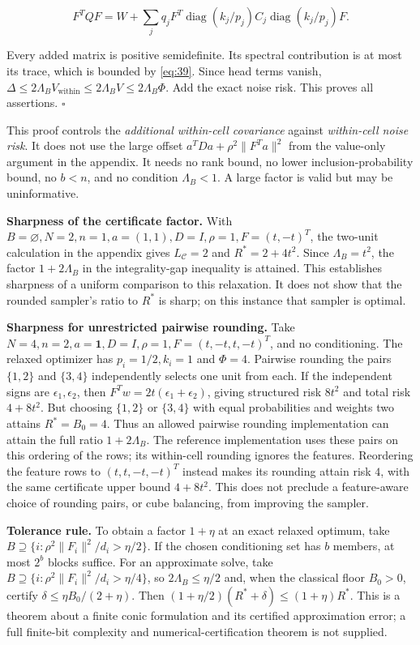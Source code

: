 \documentclass[11pt]{article}
\begin{document}
\[
F^TQF=W+\sum_jq_jF^T\operatorname{diag}(k_j/p_j)C_j\operatorname{diag}(k_j/p_j)F.
\]

Every added matrix is positive semidefinite. Its spectral contribution
is at most its trace, which is bounded by \eqref{eq:39}. Since head
terms vanish,
\(\Delta\le2\Lambda_B V_{\mathrm{within}}\le2\Lambda_B V\le2\Lambda_B\Phi\).
Add the exact noise risk. This proves all assertions. \(\square\)

This proof controls the \emph{additional within-cell covariance} against
\emph{within-cell noise risk}. It does not use the large offset
\(a^TDa+\rho^2\|F^Ta\|^2\) from the value-only argument in the appendix.
It needs no rank bound, no lower inclusion-probability bound, no
\(b<n\), and no condition \(\Lambda_B<1\). A large factor is valid but
may be uninformative.

\textbf{Sharpness of the certificate factor.} With
\(B=\varnothing,N=2,n=1,a=(1,1),D=I,\rho=1,F=(t,-t)^T\), the two-unit
calculation in the appendix gives \(L_{\mathcal C}=2\) and
\(R^*=2+4t^2\). Since \(\Lambda_B=t^2\), the factor \(1+2\Lambda_B\) in
the integrality-gap inequality is attained. This establishes sharpness
of a uniform comparison to this relaxation. It does not show that the
rounded sampler's ratio to \(R^*\) is sharp; on this instance that
sampler is optimal.

\textbf{Sharpness for unrestricted pairwise rounding.} Take
\(N=4,n=2,a=\mathbf1,D=I,\rho=1,F=(t,-t,t,-t)^T\), and no conditioning.
The relaxed optimizer has \(p_i=1/2,k_i=1\) and \(\Phi=4\). Pairwise
rounding the pairs \(\{1,2\}\) and \(\{3,4\}\) independently selects one
unit from each. If the independent signs are \(\epsilon_1,\epsilon_2\),
then \(F^Tw=2t(\epsilon_1+\epsilon_2)\), giving structured risk \(8t^2\)
and total risk \(4+8t^2\). But choosing \(\{1,2\}\) or \(\{3,4\}\) with
equal probabilities and weights two attains \(R^*=B_0=4\). Thus an
allowed pairwise rounding implementation can attain the full ratio
\(1+2\Lambda_B\). The reference implementation uses these pairs on this
ordering of the rows; its within-cell rounding ignores the features.
Reordering the feature rows to \((t,t,-t,-t)^T\) instead makes its
rounding attain risk \(4\), with the same certificate upper bound
\(4+8t^2\). This does not preclude a feature-aware choice of
rounding pairs, or cube balancing, from improving the sampler.

\textbf{Tolerance rule.} To obtain a factor \(1+\eta\) at an exact
relaxed optimum, take \(B\supseteq\{i:\rho^2\|F_i\|^2/d_i>\eta/2\}\). If
the chosen conditioning set has \(b\) members, at most \(2^b\) blocks
suffice. For an approximate solve, take
\(B\supseteq\{i:\rho^2\|F_i\|^2/d_i>\eta/4\}\), so
\(2\Lambda_B\le\eta/2\) and, when the classical floor \(B_0>0\), certify
\(\delta\le\eta B_0/(2+\eta)\). Then
\((1+\eta/2)(R^*+\delta)\le(1+\eta)R^*\). This is a theorem about a
finite conic formulation and its certified approximation error; a full
finite-bit complexity and numerical-certification theorem is not
supplied.
\end{document}
